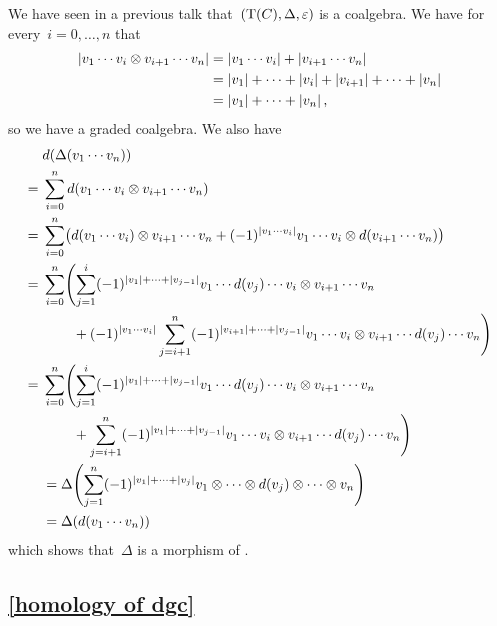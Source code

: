 \documentclass[a4paper,10pt,headings=standardclasses]{scrartcl}
\begin{document}
We have seen in a previous talk that~$(\operatorname{T}(C), \Delta, \varepsilon)$ is a coalgebra.
We have for every~$i = 0, \dotsc, n$ that
\begin{align*}
  \lvert v_1 \dotsm v_i \otimes v_{i+1} \dotsm v_n\rvert
  &=
  \lvert v_1 \dotsm v_i\rvert + \lvert v_{i+1} \dotsm v_n\rvert
  \\
  &=
  \lvert v_1\rvert + \dotsb + \lvert v_i\rvert + \lvert v_{i+1}\rvert + \dotsb + \lvert v_n\rvert
  \\
  &=
  \lvert v_1\rvert + \dotsb + \lvert v_n\rvert  \,,
\end{align*}
so we have a graded coalgebra.
We also have
\begingroup
\allowdisplaybreaks
\begin{align*}
  {}&
  d(\Delta(v_1 \dotsm v_n))
  \\
  ={}&
  \sum_{i=0}^n d(v_1 \dotsm v_i \tensor v_{i+1} \dotsm v_n)
  \\
  ={}&
  \sum_{i=0}^n
  \bigl(
      d(v_1 \dotsm v_i) \tensor v_{i+1} \dotsm v_n
    + (-1)^{\hdeg{v_1 \dotsm v_i}}
      v_1 \dotsm v_i \tensor d(v_{i+1} \dotsm v_n)
  \bigr)
  \\
  ={}&
  \sum_{i=0}^n
  \Biggl(
    \sum_{j=1}^i
    (-1)^{\hdeg{v_1} + \dotsb + \hdeg{v_{j-1}}}
    v_1 \dotsm d(v_j) \dotsm v_i \tensor v_{i+1} \dotsm v_n
  \\
  {}&
  \phantom{\sum_{i=0}^n \biggl(}
  + (-1)^{\hdeg{v_1 \dotsm v_i}}
  \sum_{j=i+1}^n
  (-1)^{\hdeg{v_{i+1}} + \dotsb + \hdeg{v_{j-1}}}
  v_1 \dotsm v_i \tensor v_{i+1} \dotsm d(v_j) \dotsm v_n
  \Biggl)
  \\
  ={}&
  \sum_{i=0}^n
  \Biggl(
    \sum_{j=1}^i
    (-1)^{\hdeg{v_1} + \dotsb + \hdeg{v_{j-1}}}
    v_1 \dotsm d(v_j) \dotsm v_i \tensor v_{i+1} \dotsm v_n
  \\
  {}&
  \phantom{\sum_{i=0}^n \biggl(}
  + \sum_{j=i+1}^n
  (-1)^{\hdeg{v_1} + \dotsb + \hdeg{v_{j-1}}}
  v_1 \dotsm v_i \tensor v_{i+1} \dotsm d(v_j) \dotsm v_n
  \Biggl)
  \\
  &=
  \Delta
  \Biggl(
    \sum_{j=1}^n
     (-1)^{\hdeg{v_1} + \dotsb + \hdeg{v_j}}
     v_1 \tensor \dotsm \tensor d(v_j) \tensor \dotsb \tensor v_n
  \Biggr)
  \\
  &=
  \Delta(d(v_1 \dotsm v_n))
\end{align*}
\endgroup
which shows that~$\Delta$ is a morphism of {\dgvs}.





\subsection{\cref{homology of dgc}}
\label{homology of dgc proof}
\end{document}
